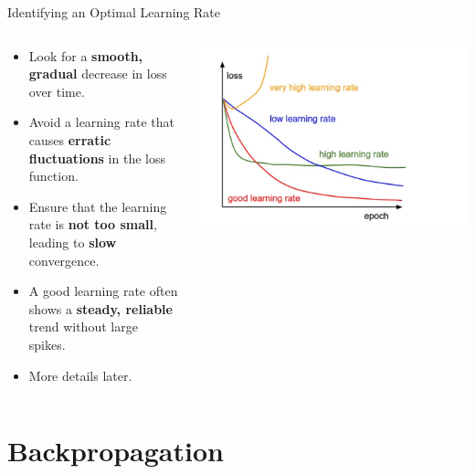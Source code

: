 \documentclass[serif, aspectratio=169]{beamer}
\begin{document}
\begin{frame}{Identifying an Optimal Learning Rate}
    \begin{columns}[T] %
        \begin{column}{0.5\textwidth}
            \begin{itemize}
                \item Look for a \textbf{smooth, gradual} decrease in loss over time.
                \item Avoid a learning rate that causes \textbf{erratic fluctuations} in the loss function.
                \item Ensure that the learning rate is \textbf{not too small}, leading to \textbf{slow} convergence.
                \item A good learning rate often shows a \textbf{steady, reliable} trend without large spikes.
                \item More details later.
            \end{itemize}
        \end{column}
        \begin{column}{0.5\textwidth}
            \begin{center}
                \includegraphics[width=\textwidth, keepaspectratio]{pic/1_rcmvCjQvsxrJi8Y4HpGcCw.png}
            \end{center}
        \end{column}
    \end{columns}
\end{frame}



\section{Backpropagation}
\end{document}
